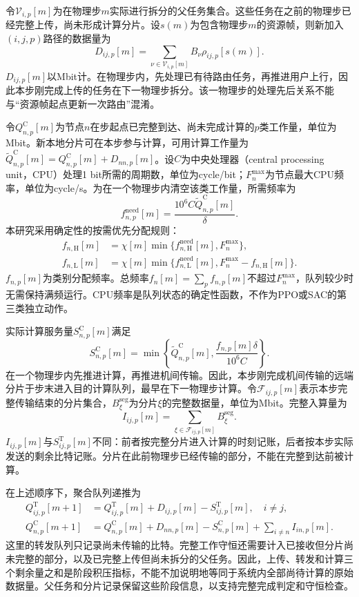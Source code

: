 令$\mathcal V_{i,p}[m]$为在物理步$m$实际进行拆分的父任务集合。这些任务在之前的物理步已经完整上传，尚未形成计算分片。设$s(m)$为包含物理步$m$的资源帧，则新加入$(i,j,p)$路径的数据量为
\[
D_{ij,p}[m]=\sum_{\nu\in\mathcal V_{i,p}[m]}
 B_\nu\rho_{ij,p}[s(m)].\tag{11}
\]
$D_{ij,p}[m]$以Mbit计。在物理步内，先处理已有待路由任务，再推进用户上行，因此本步刚完成上传的任务在下一物理步拆分。该一物理步的处理先后关系不能与“资源帧起点更新一次路由”混淆。

令$Q_{n,p}^{\mathrm C}[m]$为节点$n$在步起点已完整到达、尚未完成计算的$p$类工作量，单位为Mbit。新本地分片可在本步参与计算，可用计算工作量为$\widetilde Q_{n,p}^{\mathrm C}[m]=Q_{n,p}^{\mathrm C}[m]+D_{nn,p}[m]$。设$C$为中央处理器（central processing unit，CPU）处理1 bit所需的周期数，单位为cycle/bit；$F_n^{\max}$为节点最大CPU频率，单位为cycle/s。为在一个物理步内清空该类工作量，所需频率为
\[
f_{n,p}^{\mathrm{need}}[m]=
 \frac{10^6 C\widetilde Q_{n,p}^{\mathrm C}[m]}{\delta}.\tag{12}
\]
本研究采用确定性的按需优先分配规则：
\[
\begin{aligned}
 f_{n,\mathrm H}[m]&=\chi[m]\min\{f_{n,\mathrm H}^{\mathrm{need}}[m],F_n^{\max}\},\\
 f_{n,\mathrm L}[m]&=\chi[m]\min\{f_{n,\mathrm L}^{\mathrm{need}}[m],
 F_n^{\max}-f_{n,\mathrm H}[m]\}.
 \end{aligned}\tag{13}
\]
$f_{n,p}[m]$为类别分配频率。总频率$f_n[m]=\sum_p f_{n,p}[m]$不超过$F_n^{\max}$，队列较少时无需保持满频运行。CPU频率是队列状态的确定性函数，不作为PPO或SAC的第三类独立动作。

实际计算服务量$S^{\mathrm C}_{n,p}[m]$满足
\[
S^{\mathrm C}_{n,p}[m]=
 \min\left\{\widetilde Q_{n,p}^{\mathrm C}[m],
 \frac{f_{n,p}[m]\delta}{10^6C}\right\}.\tag{14}
\]
在一个物理步内先推进计算，再推进机间传输。因此，本步刚完成机间传输的远端分片于步末进入目的计算队列，最早在下一物理步计算。令$\mathcal F_{ij,p}[m]$表示本步完整传输结束的分片集合，$B_\xi^{\mathrm{seg}}$为分片$\xi$的完整数据量，单位为Mbit。完整入算量为
\[
I_{ij,p}[m]=\sum_{\xi\in\mathcal F_{ij,p}[m]}B_\xi^{\mathrm{seg}}.\tag{15}
\]
$I_{ij,p}[m]$与$S^{\mathrm T}_{ij,p}[m]$不同：前者按完整分片进入计算的时刻记账，后者按本步实际发送的剩余比特记账。分片在此前物理步已经传输的部分，不能在完整到达前被计算。

在上述顺序下，聚合队列递推为
\[
\begin{aligned}
 Q_{ij,p}^{\mathrm T}[m+1]
 &=Q_{ij,p}^{\mathrm T}[m]+D_{ij,p}[m]
 -S_{ij,p}^{\mathrm T}[m],\quad i\ne j,\\
 Q_{n,p}^{\mathrm C}[m+1]
 &=Q_{n,p}^{\mathrm C}[m]+D_{nn,p}[m]
 -S_{n,p}^{\mathrm C}[m]+\sum_{i\ne n}I_{in,p}[m].
 \end{aligned}\tag{16}
\]
这里的转发队列只记录尚未传输的比特。完整工作守恒还需要计入已接收但分片尚未完整的部分，以及已完整上传但尚未拆分的父任务。因此，上传、转发和计算三个剩余量之和是阶段积压指标，不能不加说明地等同于系统内全部尚待计算的原始数据量。父任务和分片记录保留这些阶段信息，以支持完整完成判定和守恒检查。

